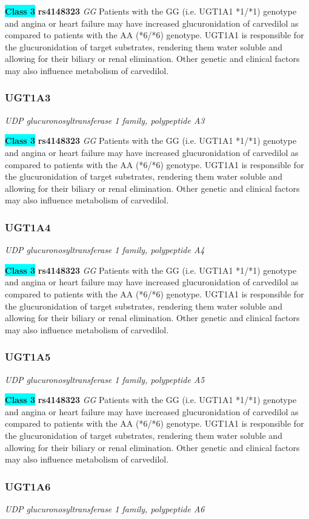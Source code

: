 \documentclass{report}
\begin{document}
\textbf{\colorbox{cyan} {Class 3}} \textbf{ rs4148323 } \textit{ GG }
Patients with the GG (i.e. UGT1A1 *1/*1) genotype and angina or heart failure may have increased glucuronidation of carvedilol as compared to patients with the AA (*6/*6) genotype. UGT1A1 is responsible for the glucuronidation of target substrates, rendering them water soluble and allowing for their biliary or renal elimination. Other genetic and clinical factors may also influence metabolism of carvedilol.\newline\subsubsection{ UGT1A3 }
\textit{ UDP glucuronosyltransferase 1 family, polypeptide A3 }

\textbf{\colorbox{cyan} {Class 3}} \textbf{ rs4148323 } \textit{ GG }
Patients with the GG (i.e. UGT1A1 *1/*1) genotype and angina or heart failure may have increased glucuronidation of carvedilol as compared to patients with the AA (*6/*6) genotype. UGT1A1 is responsible for the glucuronidation of target substrates, rendering them water soluble and allowing for their biliary or renal elimination. Other genetic and clinical factors may also influence metabolism of carvedilol.\newline\subsubsection{ UGT1A4 }
\textit{ UDP glucuronosyltransferase 1 family, polypeptide A4 }

\textbf{\colorbox{cyan} {Class 3}} \textbf{ rs4148323 } \textit{ GG }
Patients with the GG (i.e. UGT1A1 *1/*1) genotype and angina or heart failure may have increased glucuronidation of carvedilol as compared to patients with the AA (*6/*6) genotype. UGT1A1 is responsible for the glucuronidation of target substrates, rendering them water soluble and allowing for their biliary or renal elimination. Other genetic and clinical factors may also influence metabolism of carvedilol.\newline\subsubsection{ UGT1A5 }
\textit{ UDP glucuronosyltransferase 1 family, polypeptide A5 }

\textbf{\colorbox{cyan} {Class 3}} \textbf{ rs4148323 } \textit{ GG }
Patients with the GG (i.e. UGT1A1 *1/*1) genotype and angina or heart failure may have increased glucuronidation of carvedilol as compared to patients with the AA (*6/*6) genotype. UGT1A1 is responsible for the glucuronidation of target substrates, rendering them water soluble and allowing for their biliary or renal elimination. Other genetic and clinical factors may also influence metabolism of carvedilol.\newline\subsubsection{ UGT1A6 }
\textit{ UDP glucuronosyltransferase 1 family, polypeptide A6 }
\end{document}
